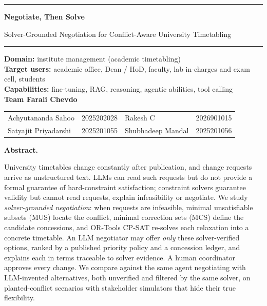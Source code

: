 \documentclass[11pt,a4paper]{article}
\begin{document}
\begin{center}
{\color{secblue}\rule{\textwidth}{0.8pt}}\par\vspace{2pt}
{\Large\bfseries Negotiate, Then Solve\par}
\vspace{2pt}
{\large Solver-Grounded Negotiation for Conflict-Aware University Timetabling\par}
\vspace{2pt}
{\color{secblue}\rule{\textwidth}{0.8pt}}\par
\vspace{3pt}
{\small\textbf{Domain:} institute management (academic timetabling)\\
\textbf{Target users:} academic office, Dean / HoD, faculty, lab in-charges and exam cell, students\\
\textbf{Capabilities:} fine-tuning, RAG, reasoning, agentic abilities, tool calling\\
\textbf{Team Farali Chevdo}\\[2pt]
\begin{tabular}{@{}l@{\;\;}l@{\qquad}l@{\;\;}l@{}}
Achyutananda Sahoo & 2025202028 & Rakesh C & 2026901015\\
Satyajit Priyadarshi & 2025201055 & Shubhadeep Mandal & 2025201056\\
\end{tabular}\par}
\end{center}

\noindent\textbf{Abstract.} {\small University timetables change constantly
after publication, and change requests arrive as unstructured text. LLMs can
read such requests but do not provide a formal guarantee of hard-constraint
satisfaction; constraint
solvers guarantee validity but cannot read requests, explain infeasibility or
negotiate. We study \emph{solver-grounded negotiation}: when requests are
infeasible, minimal unsatisfiable subsets (MUS) locate the conflict, minimal
correction sets (MCS) define the candidate concessions, and OR-Tools CP-SAT
re-solves each relaxation into a concrete timetable. An LLM negotiator may
offer \emph{only} these solver-verified options, ranked by a published
priority policy and a concession ledger, and explains each in terms traceable
to solver evidence. A human coordinator approves every change. We compare
against the same agent negotiating with LLM-invented alternatives, both
unverified and filtered by the same solver, on planted-conflict scenarios
with stakeholder simulators that hide their true flexibility.\par}
\end{document}
